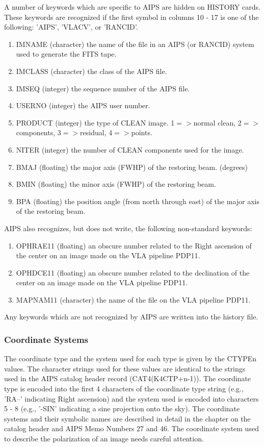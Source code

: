 A number of keywords which are specific to AIPS are hidden on HISTORY
cards.  These keywords are recognized if the first symbol in columns
10 - 17 is one of the following: 'AIPS', 'VLACV', or 'RANCID'.
\begin{enumerate} %
\item IMNAME (character) the name of the file in an AIPS (or RANCID) system
used to generate the FITS tape.
\item IMCLASS (character) the class of the AIPS file.
\item IMSEQ (integer) the sequence number of the AIPS file.
\item USERNO (integer) the AIPS user number.
\item PRODUCT (integer) the type of CLEAN image. 1$=>$normal clean,
2$=>$components, 3$=>$residual, 4$=>$points.
\item NITER (integer) the number of CLEAN components used for the image.
\item BMAJ (floating) the major axis (FWHP) of the restoring beam. (degrees)
\item BMIN (floating) the minor axis (FWHP) of the restoring beam.
\item BPA (floating) the position angle (from north through east) of the
major axis of the restoring beam.

\end{enumerate} %
AIPS also recognizes, but does not write, the following non-standard
keywords:
\begin{enumerate} %
\item OPHRAE11 (floating) an obscure number related to the Right ascension
of the center on an image made on the VLA pipeline PDP11.
\item OPHDCE11 (floating) an obscure number related to the declination of
the center on an image made on the VLA pipeline PDP11.
\item MAPNAM11 (character) the name of the file on the VLA pipeline PDP11.
\end{enumerate} %
Any keywords which are not recognized by AIPS are written into the
history file.

\subsubsection{Coordinate Systems }
The coordinate type and the system used for each type is given by the
CTYPEn values.  The character strings used for these values are
identical to the strings used in the AIPS catalog header record
(CAT4(K4CTP+n-1)).  The coordinate type is encoded into the first 4
characters of the coordinate type string (e.g., 'RA--' indicating
Right ascension) and the system used is encoded into characters 5 - 8
(e.g., '-SIN' indicating a sine projection onto the sky).  The
coordinate systems and their symbolic names are described in detail in
the chapter on the catalog header and AIPS Memo Numbers 27 and 46.
The coordinate system used to describe the polarization of an image
needs careful attention.

